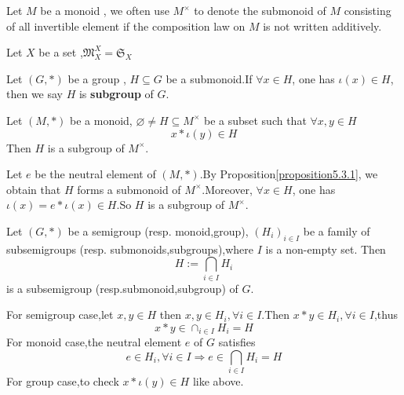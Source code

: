 \documentclass{book}
\numberwithin{equation}{section}
\begin{document}
\begin{notationenv}
    Let $M$ be a monoid , we often use $M^\times$ to denote the submonoid of $M$ consisting of all invertible element if the composition law on $M$ is not written additively.
\end{notationenv}
\begin{exampleenv}
    Let $X$ be a set ,$\mathfrak{M} _X^X=\mathfrak{S} _X$
\end{exampleenv}
\begin{definitionenv}
    Let $(G,*)$ be a group , $H\subseteq G$ be a submonoid.If $\forall x\in H$, one has $\iota(x)\in H$, then we say $H$ is \textbf{subgroup} of $G$.
\end{definitionenv}
\begin{propositionenv}
    Let $(M,*)$ be a monoid, $\varnothing \not=H\subseteq M^\times$ be a subset such that $\forall x,y \in H$
    $$x*\iota(y)\in H$$
    Then $H$ is a subgroup of $M^\times$.
\end{propositionenv}
\begin{proofenv}
    Let $e$ be the neutral element of $(M,*)$.By Proposition\ref{proposition5.3.1}, we obtain that $H$ forms a submonoid of $M^\times$.Moreover, $\forall x \in H$, one has $\iota(x)=e*\iota(x)\in H$.So $H$ is a subgroup of $M^\times$.
\end{proofenv}
\begin{propositionenv}
    Let $(G,*)$ be a semigroup (resp. monoid,group), $(H_i)_{i\in I}$ be a family of subsemigroups (resp. submonoids,subgroups),where $I$ is a non-empty set. Then 
    $$H:=\bigcap_{i\in I}H_i$$
    is a subsemigroup (resp.submonoid,subgroup) of $G$.
\end{propositionenv}
\begin{proofenv}
    \quad\newline
    For semigroup case,let $x,y\in H$ then $x,y\in H_i,\forall i \in I$.Then $x*y\in H_i,\forall i \in I $,thus 
    $$x*y\in \cap_{i\in I}H_i=H$$
    For monoid case,the neutral element $e$ of $G$ satisfies
    $$e \in H_i,\forall i \in I\Rightarrow e\in \bigcap_{i\in I}H_i=H$$
    For group case,to check $x*\iota(y)\in H$ like above.
\end{proofenv}
\end{document}
